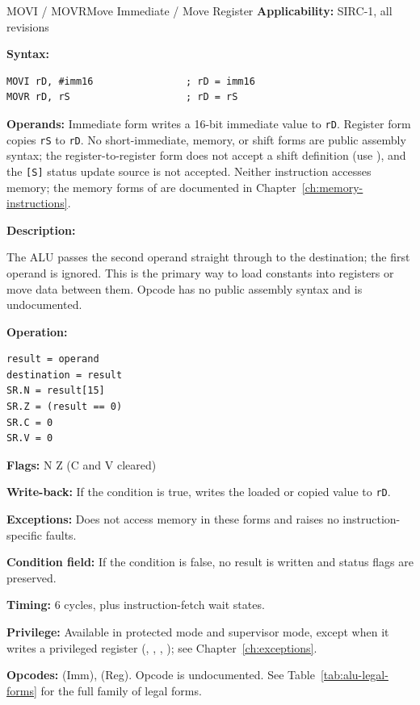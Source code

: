 \begin{instructionbox}{MOVI / MOVR}{Move Immediate / Move Register}
	\textbf{Applicability:} SIRC-1, all revisions

	\textbf{Syntax:}
	\begin{lstlisting}
MOVI rD, #imm16                ; rD = imm16
MOVR rD, rS                    ; rD = rS
\end{lstlisting}

	\textbf{Operands:} Immediate form writes a 16-bit immediate value to \texttt{rD}. Register form copies \texttt{rS} to
	\texttt{rD}. No short-immediate, memory, or shift forms are public assembly syntax; the register-to-register form
	does not accept a shift definition (use ), and the \texttt{[S]} status update source is not accepted. Neither instruction accesses memory; the memory forms of
	 are documented in Chapter~\ref{ch:memory-instructions}.

	\textbf{Description:}

	The ALU passes the second operand straight through to the destination; the first operand is ignored. This is the
	primary way to load constants into registers or move data between them. Opcode  has no public assembly
	syntax and is undocumented.

	\textbf{Operation:}
	\begin{verbatim}
result = operand
destination = result
SR.N = result[15]
SR.Z = (result == 0)
SR.C = 0
SR.V = 0
\end{verbatim}

	\textbf{Flags:} N Z (C and V cleared)

	\textbf{Write-back:} If the condition is true, writes the loaded or copied value to \texttt{rD}.

	\textbf{Exceptions:} Does not access memory in these forms and raises no instruction-specific faults.

	\textbf{Condition field:} If the condition is false, no result is written and status flags are preserved.

	\textbf{Timing:} 6 cycles, plus instruction-fetch wait states.

	\textbf{Privilege:} Available in protected mode and supervisor mode, except when it writes a
	privileged register (, , , ); see Chapter~\ref{ch:exceptions}.

	\textbf{Opcodes:}  (Imm),  (Reg). Opcode  is undocumented. See Table~\ref{tab:alu-legal-forms} for the full family of legal forms.


\end{instructionbox}
